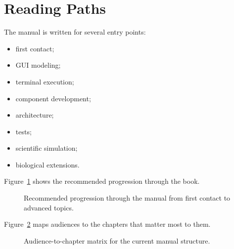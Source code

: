 \section*{Reading Paths}
\label{sec:front-matter-reading-paths}

The manual is written for several entry points:

\begin{itemize}
\item first contact;
\item GUI modeling;
\item terminal execution;
\item component development;
\item architecture;
\item tests;
\item scientific simulation;
\item biological extensions.
\end{itemize}

Figure~\ref{fig:manual-reading-map} shows the recommended progression through the book.

\begin{figure}[htbp]
\centering
{}
\caption{Recommended progression through the manual from first contact to advanced topics.}
\label{fig:manual-reading-map}
\end{figure}

Figure~\ref{fig:manual-audience-matrix} maps audiences to the chapters that matter most to them.

\begin{figure}[htbp]
\centering
{}
\caption{Audience-to-chapter matrix for the current manual structure.}
\label{fig:manual-audience-matrix}
\end{figure}
